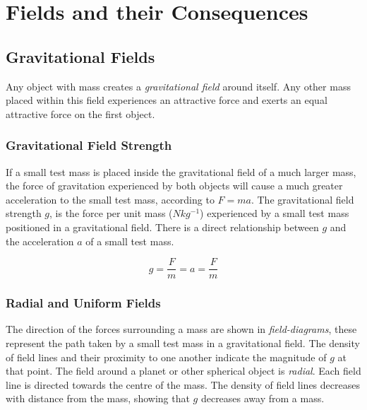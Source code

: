 \documentclass[12pt]{article}
\begin{document}
\section{Fields and their Consequences}
\label{sec:org4b77efb}
\subsection{Gravitational Fields}
\label{sec:orgf1605ac}

Any object with mass creates a \emph{gravitational field} around itself. Any other mass placed within this field experiences an attractive force and exerts an equal attractive force on the first object.

\subsubsection{Gravitational Field Strength}
\label{sec:org2b7c9e1}

If a small test mass is placed inside the gravitational field of a much larger mass, the force of gravitation experienced by both objects will cause a much greater acceleration to the small test mass, according to \(F = ma\). The gravitational field strength \(g\), is the force per unit mass (\(Nkg^{-1}\)) experienced by a small test mass positioned in a gravitational field. There is a direct relationship between \(g\) and the acceleration \(a\) of a small test mass.

\[g = \dfrac{F}{m} = a = \dfrac{F}{m}\]

\subsubsection{Radial and Uniform Fields}
\label{sec:orgbbaf409}

The direction of the forces surrounding a mass are shown in \emph{field-diagrams}, these represent the path taken by a small test mass in a gravitational field. The density of field lines and their proximity to one another indicate the magnitude of \(g\) at that point. The field around a planet or other spherical object is \emph{radial}. Each field line is directed towards the centre of the mass. The density of field lines decreases with distance from the mass, showing that \(g\) decreases away from a mass.
\end{document}
